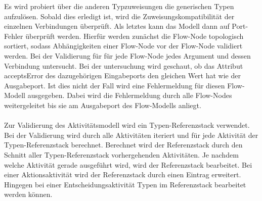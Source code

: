 \documentclass{article}
\begin{document}
    Es wird probiert über die anderen Typzuweisungen die generischen Typen aufzulösen. 
    Sobald dies erledigt ist, wird die Zuweisungskompatibilität der einzelnen Verbindungen überprüft. 
    Als letztes kann das Modell dann auf Port-Fehler überprüft werden. 
    Hierfür werden zunächst die Flow-Node topologisch sortiert, sodass Abhängigkeiten einer Flow-Node vor der Flow-Node validiert werden. 
    Bei der Validierung für für jede Flow-Node jedes Argument und dessen Verbindung untersucht. 
    Bei der untersuchung wird geschaut, ob das Attribut acceptsError des dazugehörigen Eingabeports den gleichen Wert hat wie der Ausgabeport. 
    Ist dies nicht der Fall wird eine Fehlermeldung für diesen Flow-Modell ausgegeben. 
    Dabei wird die Fehlermeldung durch alle Flow-Nodes weitergeleitet bis sie am Ausgabeport des Flow-Modells anliegt.\\
    \\
    Zur Validierung des Aktivitätsmodell wird ein Typen-Referenzstack verwendet.
    Bei der Validierung wird durch alle Aktivitäten iteriert und für jede Aktivität der Typen-Referenzstack berechnet.
    Berechnet wird der Referenzstack durch den Schnitt aller Typen-Referenzstack vorhergehenden Aktivitäten.
    Je nachdem welche Aktivität gerade ausgeführt wird, wird der Referenzstack bearbeitet.
    Bei einer Aktionsaktivität wird der Referenzstack durch einen Eintrag erweitert.
    Hingegen bei einer Entscheidungsaktivität Typen im Referenzstack bearbeitet werden können.

\end{document}
